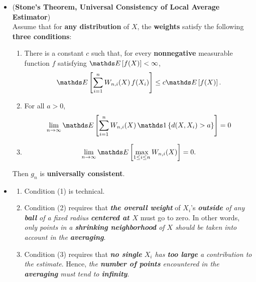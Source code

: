 \documentclass[11pt]{article}
\begin{document}
\begin{itemize}
\item \begin{theorem} (\textbf{Stone's Theorem, Universal Consistency of Local Average Estimator}) \citep{devroye2013probabilistic}\\
Assume that for \textbf{any distribution} of $X$, the \textbf{weights} satisfy the following \textbf{three conditions}:
\begin{enumerate}
\item There is a constant $c$ such that, for every \textbf{nonnegative} measurable function $f$ satisfying $\E{}{f(X)} < \infty$,
\begin{align*}
\E{}{\sum_{i=1}^{n}W_{n,i}(X)\,f(X_i)} \le c\E{}{f(X)}.
\end{align*}

\item For all $a > 0$,
\begin{align*}
\lim\limits_{n\rightarrow \infty}\E{}{\sum_{i=1}^{n}W_{n,i}(X)\,\ind{d(X, X_i) > a}} = 0
\end{align*}

\item 
\begin{align*}
\lim\limits_{n\rightarrow \infty}\E{}{\max_{1 \le i \le n}W_{n,i}(X)} = 0.
\end{align*}
\end{enumerate}
Then $g_n$ is \textbf{universally consistent}.
\end{theorem}

\item \begin{remark}
\begin{enumerate}
\item Condition (1) is technical.

\item Condition (2) requires that \emph{\textbf{the overall weight}} of $X_i$'s \emph{\textbf{outside} of any \textbf{ball} of a fixed radius \textbf{centered at $X$}} must go to zero. In other words, \emph{only points in a \textbf{shrinking neighborhood} of $X$ should be taken into account in the \textbf{averaging}}.

\item Condition (3) requires that \emph{\textbf{no single} $X_i$ has \textbf{too large} a contribution to the estimate}.
Hence, \emph{the \textbf{number of points} encountered in the \textbf{averaging} must tend to \textbf{infinity}}.
\end{enumerate}



\end{remark}


\end{itemize}
\newpage


\end{document}
